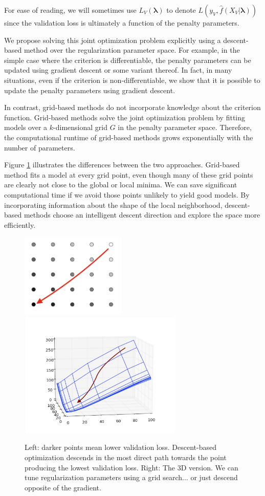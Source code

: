 \documentclass[10pt,letterpaper]{article}
\begin{document}
For ease of reading, we will sometimes use $L_V(\boldsymbol{\lambda})$ to denote $L(y_V, \hat f(X_V | \boldsymbol{\lambda}))$ since the validation loss is ultimately a function of the penalty parameters.

We propose solving this joint optimization problem explicitly using a descent-based method over the regularization parameter space. For example, in the simple case where the criterion is differentiable, the penalty parameters can be updated using gradient descent or some variant thereof. In fact, in many situations, even if the criterion is non-differentiable, we show that it is possible to update the penalty parameters using gradient descent.

In contrast, grid-based methods do not incorporate knowledge about the criterion function. Grid-based methods solve the joint optimization problem by fitting models over a $k$-dimensional grid $G$ in the penalty parameter space. Therefore, the computational runtime of grid-based methods grows exponentially with the number of parameters.

Figure \ref{fig:compare} illustrates the differences between the two approaches. Grid-based method fits a model at every grid point, even though many of these grid points are clearly not close to the global or local minima. We can save significant computational time if we avoid those points unlikely to yield good models. By incorporating information about the shape of the local neighborhood, descent-based methods choose an intelligent descent direction and explore the space more efficiently. 

\begin{figure}
\begin{center}
\includegraphics[height=40mm]{grid_search_vs_descent.png}
\includegraphics[height=60mm]{surface_in_regularization_parameters.png}
\end{center}
\caption{Left: darker points mean lower validation loss. Descent-based optimization descends in the most direct path towards the point producing the lowest validation loss. Right: The 3D version. We can tune regularization parameters using a grid search... or just descend opposite of the gradient.}
\label{fig:compare}
\end{figure}
\end{document}
